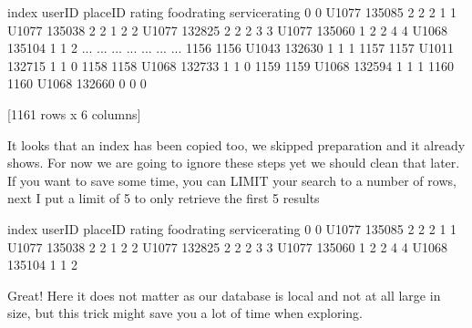 \documentclass[letterpaper,10pt,english]{jupyterBook}
\begin{document}
\begin{sphinxVerbatim}[commandchars=\\\{\}]
      index userID  placeID  rating  food\PYGZus{}rating  service\PYGZus{}rating
0         0  U1077   135085       2            2               2
1         1  U1077   135038       2            2               1
2         2  U1077   132825       2            2               2
3         3  U1077   135060       1            2               2
4         4  U1068   135104       1            1               2
...     ...    ...      ...     ...          ...             ...
1156   1156  U1043   132630       1            1               1
1157   1157  U1011   132715       1            1               0
1158   1158  U1068   132733       1            1               0
1159   1159  U1068   132594       1            1               1
1160   1160  U1068   132660       0            0               0

[1161 rows x 6 columns]
\end{sphinxVerbatim}

\sphinxAtStartPar
It looks that an index has been copied too, we skipped preparation and it already shows. For now we are going to ignore these steps yet we should clean that later.
If you want to save some time, you can LIMIT your search to a number of rows, next I put a limit of 5 to only retrieve the first 5 results

\begin{sphinxVerbatim}[commandchars=\\\{\}]
  
\end{sphinxVerbatim}

\begin{sphinxVerbatim}[commandchars=\\\{\}]
   index userID  placeID  rating  food\PYGZus{}rating  service\PYGZus{}rating
0      0  U1077   135085       2            2               2
1      1  U1077   135038       2            2               1
2      2  U1077   132825       2            2               2
3      3  U1077   135060       1            2               2
4      4  U1068   135104       1            1               2
\end{sphinxVerbatim}

\sphinxAtStartPar
Great! Here it does not matter as our database is local and not at all large in size, but this trick might save you a lot of time when exploring.
\end{document}
